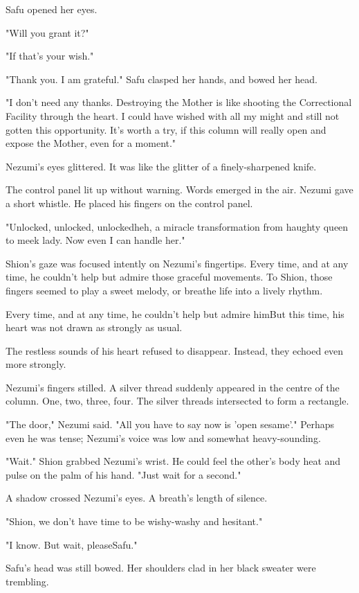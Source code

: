 Safu opened her eyes.

"\el Will you grant it?"

"If that's your wish."

\mybreak

"Thank you. I am grateful." Safu clasped her hands, and bowed her head.

"I don't need any thanks. Destroying the Mother is like shooting the
Correctional Facility through the heart. I could have wished with all my
might and still not gotten this opportunity. It's worth a try, if this
column will really open and expose the Mother, even for a moment."

Nezumi's eyes glittered. It was like the glitter of a finely-sharpened
knife.

The control panel lit up without warning. Words emerged in the air.
Nezumi gave a short whistle. He placed his fingers on the control panel.

"Unlocked, unlocked, unlocked\el heh, a miracle transformation from
haughty queen to meek lady. Now even I can handle her."

Shion's gaze was focused intently on Nezumi's fingertips. Every time,
and at any time, he couldn't help but admire those graceful movements.
To Shion, those fingers seemed to play a sweet melody, or breathe life
into a lively rhythm.

Every time, and at any time, he couldn't help but admire him\el But
this time, his heart was not drawn as strongly as usual.

The restless sounds of his heart refused to disappear. Instead, they
echoed even more strongly.

Nezumi's fingers stilled. A silver thread suddenly appeared in the
centre of the column. One, two, three, four. The silver threads
intersected to form a rectangle.

"The door," Nezumi said. "All you have to say now is 'open sesame'."
Perhaps even he was tense; Nezumi's voice was low and somewhat
heavy-sounding.

"Wait." Shion grabbed Nezumi's wrist. He could feel the other's body
heat and pulse on the palm of his hand. "Just wait for a second."

A shadow crossed Nezumi's eyes. A breath's length of silence.

"Shion, we don't have time to be wishy-washy and hesitant."

"I know. But wait, please\el Safu."

Safu's head was still bowed. Her shoulders clad in her black sweater
were trembling.

